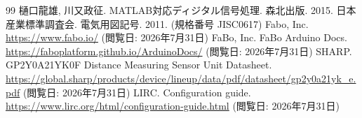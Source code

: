 \documentclass[a4paper,12pt]{ltjsbook}
\begin{document}
  
  \begin{thebibliography}{99}
   樋口龍雄, 川又政征. MATLAB対応ディジタル信号処理. 森北出版. 2015.
   日本産業標準調査会. 電気用図記号. 2011. (規格番号 JISC0617)
   Fabo, Inc. \\ \url{https://www.fabo.io/} (閲覧日: 2026年7月31日)
   FaBo, Inc. FaBo Arduino Docs. \\ \url{https://faboplatform.github.io/ArduinoDocs/} (閲覧日: 2026年7月31日)
   SHARP. GP2Y0A21YK0F Distance Measuring Sensor Unit Datasheet. \\ \url{https://global.sharp/products/device/lineup/data/pdf/datasheet/gp2y0a21yk_e.pdf} (閲覧日: 2026年7月31日)
   LIRC. Configuration guide. \\ \url{https://www.lirc.org/html/configuration-guide.html} (閲覧日: 2026年7月31日)
  \end{thebibliography}
\end{document}
